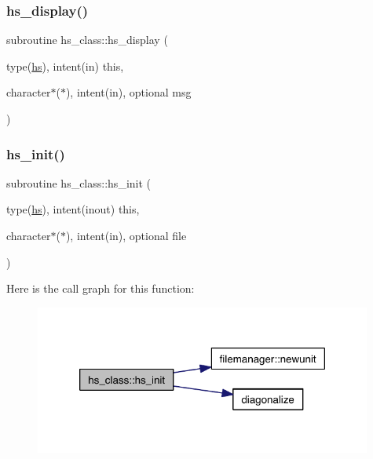 \mbox{\label{namespacehs__class_af457ecc48ec3ffc1c107162e546155ce}} 
\subsubsection{\texorpdfstring{hs\+\_\+display()}{hs\_display()}}
{\footnotesize\ttfamily subroutine hs\+\_\+class\+::hs\+\_\+display (\begin{DoxyParamCaption}\item[{type(\hyperlink{strucths__class_1_1hs}{hs}), intent(in)}]{this,  }\item[{character$\ast$($\ast$), intent(in), optional}]{msg }\end{DoxyParamCaption})\hspace{0.3cm}{\ttfamily [private]}}

\mbox{\label{namespacehs__class_a7857d1f3d6a49cfbc7d397a084a9013f}} 
\subsubsection{\texorpdfstring{hs\+\_\+init()}{hs\_init()}}
{\footnotesize\ttfamily subroutine hs\+\_\+class\+::hs\+\_\+init (\begin{DoxyParamCaption}\item[{type(\hyperlink{strucths__class_1_1hs}{hs}), intent(inout)}]{this,  }\item[{character$\ast$($\ast$), intent(in), optional}]{file }\end{DoxyParamCaption})\hspace{0.3cm}{\ttfamily [private]}}

Here is the call graph for this function\+:\nopagebreak
\begin{figure}[H]
\begin{center}
\leavevmode
\includegraphics[width=314pt]{namespacehs__class_a7857d1f3d6a49cfbc7d397a084a9013f_cgraph}
\end{center}
\end{figure}
\mbox{\label{namespacehs__class_a1d1b34bdecfb1004bd277bf53dbd3e92}} 
